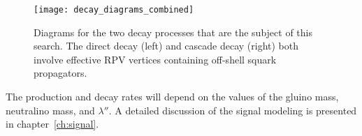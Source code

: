 \begin{figure}[ht!]
    \centering
\texttt{[image: decay\_diagrams\_combined]}
\caption{Diagrams for the two decay processes that are the subject of this search. The direct decay (left) and cascade decay (right)
both involve effective RPV vertices containing off-shell squark propagators.}
\label{fig:susy_rpv_decays}
\end{figure}
The production and decay rates will depend on the values of the gluino mass, neutralino mass, and $\lambda''$.
A detailed discussion of the signal modeling is presented in chapter~\ref{ch:signal}.
